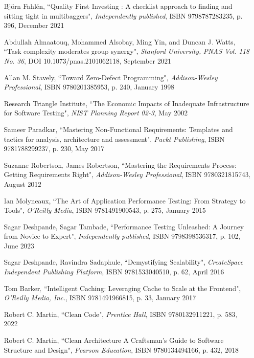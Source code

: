 \begin{thebibliography}{100}
 Björn Fahlén, ``Quality First Investing : A checklist approach to finding and sitting tight 
in multibaggers", \emph{Independently published}, ISBN 9798787283235, p. 396, December 2021

 Abdullah Almaatouq, Mohammed Alsobay, Ming Yin, and Duncan J. Watts, ``Task complexity moderates 
group synergy", \emph{Stanford University, PNAS Vol. 118 No. 36}, DOI 10.1073/pnas.2101062118, September 2021

 Allan M. Stavely, ``Toward Zero-Defect Programming", \emph{Addison-Wesley Professional}, 
ISBN 9780201385953, p. 240, January 1998

 Research Triangle Institute, ``The Economic Impacts of Inadequate Infrastructure for 
Software Testing", \emph{NIST Planning Report 02-3}, May 2002

 Sameer Paradkar, ``Mastering Non-Functional Requirements: Templates and tactics for analysis, 
architecture and assessment", \emph{Packt Publishing}, ISBN 9781788299237, p. 230, May 2017

 Suzanne Robertson, James Robertson, ``Mastering the Requirements Process: Getting Requirements 
Right", \emph{Addison-Wesley Professional}, ISBN 9780321815743, August 2012

 Ian Molyneaux, ``The Art of Application Performance Testing: From Strategy to Tools", 
\emph{O'Reilly Media}, ISBN 9781491900543, p. 275, January 2015

 Sagar Deshpande, Sagar Tambade, ``Performance Testing Unleashed: A Journey from Novice to Expert", 
\emph{Independently published}, ISBN 9798398536317, p. 102, June 2023

 Sagar Deshpande, Ravindra Sadaphule, ``Demystifying Scalability", \emph{CreateSpace Independent 
Publishing Platform}, ISBN 9781533040510, p. 62, April 2016

 Tom Barker, ``Intelligent Caching: Leveraging Cache to Scale at the Frontend", 
\emph{O'Reilly Media, Inc.}, ISBN 9781491966815, p. 33, January 2017

 Robert C. Martin, ``Clean Code", \emph{Prentice Hall}, ISBN 9780132911221, p. 583, 2022

 Robert C. Martin, ``Clean Architecture A Craftsman's Guide to Software Structure and 
Design", \emph{Pearson Education}, ISBN 9780134494166, p. 432, 2018


\end{thebibliography}
